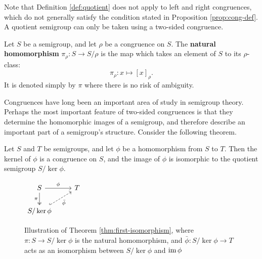 Note that Definition \ref{def:quotient} does not apply to left and right
congruences, which do not generally satisfy the condition stated in Proposition
\ref{prop:cong-def}.  A quotient semigroup can only be taken using a two-sided
congruence.

\begin{definition}
  \label{def:natural-homomorphism}
  Let $S$ be a semigroup, and let $\rho$ be a congruence on $S$.  The
  \textbf{natural homomorphism} $\pi_\rho: S \to S / \rho$ is the map which
  takes an element of $S$ to its $\rho$-class:
  $$\pi_\rho: x \mapsto [x]_\rho.$$
  It is denoted simply by $\pi$ where there is no risk of ambiguity.
\end{definition}

Congruences have long been an important area of study in semigroup theory.
Perhaps the most important feature of two-sided congruences is that they
determine the homomorphic images of a semigroup, and therefore describe an
important part of a semigroup's structure.  Consider the following theorem.

\begin{theorem}
  \label{thm:first-isomorphism}
  Let $S$ and $T$ be semigroups, and let $\phi$ be a homomorphism from $S$ to
  $T$.  Then the kernel of $\phi$ is a congruence on $S$, and the image of
  $\phi$ is isomorphic to the quotient semigroup $S / \ker{\phi}$.
\end{theorem}

\begin{figure}[ht]
  \centering
  $
  \begin{tikzcd}
    S \ar[d, two heads, "\pi"'] \ar[r, "\phi"] & T \\
    S / \ker{\phi} \ar[ur, dashed, hook, "\bar\phi"']
  \end{tikzcd}
  $
  \caption[Illustration of Theorem \ref{thm:first-isomorphism}]
  {Illustration of Theorem \ref{thm:first-isomorphism}, where
    $\pi : S \to S/\ker\phi$ is the natural homomorphism, and
    $\bar\phi: S/\ker\phi \to T$ acts as an isomorphism between $S/\ker\phi$ and
    $\operatorname{im}\phi$}
  \label{fig:first-isomorphism-theorem}
\end{figure}

